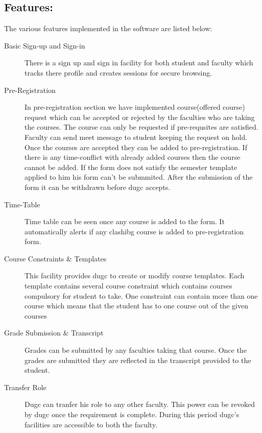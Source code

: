 \documentclass[letterpaper,12pt]{article}
\begin{document}
\subsection{Features:}
The various features implemented in the software are listed below:
\begin{description}
\item[Basic Sign-up and Sign-in]
There is a sign up and sign in facility for both student and faculty which
tracks there profile and creates sessions for secure browsing.
\item[Pre-Registration]
 In pre-registration section we have implemented course(offered course) request
 which can be accepted or rejected by the faculties who are taking the courses.
 The course can only be requested if pre-requsites are satisfied. Faculty can send
 meet message to student keeping the request on hold.
 Once the courses are accepted they can be added to pre-registration. If there is any 
 time-conflict with already added courses then the course cannot be added.
 If the form does not satisfy the semester template applied to him his form can't be submmited.
 After the submission of the form it can be withdrawn before dugc accepts.
 \item[Time-Table]
 Time table can be seen once any course is added to the form. It automatically alerts if any 
 clashibg course is added to pre-registration form.
 \item[Course Constraints \& Templates]
 This facility provides dugc to create or modify course templates. Each template contains 
 several course constraint which contains courses compulsory for student to take. One constraint
 can contain more than one course which means that the student has to one course out of the given courses
 \item[Grade Submission \& Transcript]
 Grades can be submitted by any faculties taking that
 course. Once the grades are submitted they are reflected in the transcript provided to the student.
 \item[Transfer Role]
Dugc can tranfer his role to any other faculty. This power can be revoked by dugc once the requirement
is complete. During this period dugc's facilities are accessible to both the faculty.
\end{description}
\end{document}
